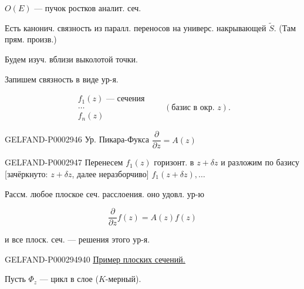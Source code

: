 $O(E)$ --- пучок ростков аналит. сеч.

Есть канонич. связность из паралл. переносов на универс. накрывающей $\tilde S$. (Там прям. произв.)

Будем изуч. вблизи выколотой точки.

Запишем связность в виде ур-я.

\begin{equation*}\begin{array}{l}f_1(z)\text{ --- сечения}\\\ldots\\f_n(z)\end{array}\qquad(\text{базис в окр. }z).\end{equation*}

\begin{GelfandAdjacentEvidence}{GELFAND-P000294}{6}
Ур. Пикара-Фукса $\dfrac{\partial}{\partial z}=A(z)$

\end{GelfandAdjacentEvidence}


\begin{GelfandAdjacentEvidence}{GELFAND-P000294}{7}
Перенесем $f_1(z)$ горизонт. в $z+\delta z$ и разложим по базису [зачёркнуто: $z+\delta z$, далее неразборчиво] $f_1(z+\delta z),\ldots$

\end{GelfandAdjacentEvidence}


Рассм. любое плоское сеч. расслоения. оно удовл. ур-ю

\begin{equation*}\frac{\partial}{\partial z}f(z)=A(z)f(z)\end{equation*}

и все плоск. сеч. --- решения этого ур-я.

\begin{GelfandAdjacentEvidence}{GELFAND-P000294}{940}
\underline{\underline{Пример плоских сечений.}}

Пусть $\Phi_z$ --- цикл в слое ($K$-мерный).

\end{GelfandAdjacentEvidence}


